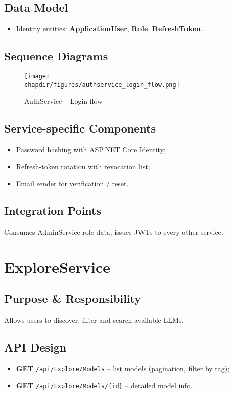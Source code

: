 \subsection{Data Model}
\begin{itemize}
  \item Identity entities: \textbf{ApplicationUser}, \textbf{Role}, \textbf{RefreshToken}.
\end{itemize}

\subsection{Sequence Diagrams}
\begin{figure}[h]
    \centering
    \texttt{[image: \\chapdir/figures/authservice\_login\_flow.png]}
    \caption{AuthService – Login flow}
\end{figure}

\subsection{Service-specific Components}
\begin{itemize}
  \item Password hashing with ASP.NET Core Identity;
  \item Refresh-token rotation with revocation list;
  \item Email sender for verification / reset.
\end{itemize}

\subsection{Integration Points}
Consumes AdminService role data; issues JWTs to every other service.

\section{ExploreService}
\subsection{Purpose \& Responsibility}
Allows users to discover, filter and search available LLMs.

\subsection{API Design}
\begin{itemize}
  \item \textbf{GET} \texttt{/api/Explore/Models} – list models (pagination, filter by tag);
  \item \textbf{GET} \texttt{/api/Explore/Models/\{id\}} – detailed model info.
\end{itemize}

